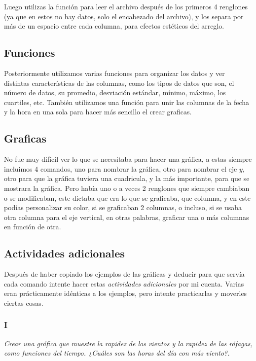 \documentclass{article}
\begin{document}
Luego utilizas la función para leer el archivo después de los primeros 4 renglones (ya que en estos no hay datos, solo el encabezado del archivo), y los separa por más de un espacio entre cada columna, para efectos estéticos del arreglo.

\subsection{Funciones}

Posteriormente utilizamos varias funciones para organizar los datos y ver distintas características de las columnas, como los tipos de datos que son, el número de datos, su promedio, desviación estándar, mínimo, máximo, los cuartiles, etc.
También utilizamos una función para unir las columnas de la fecha y la hora en una sola para hacer más sencillo el crear graficas.

\subsection{Graficas}

No fue muy difícil ver lo que se necesitaba para hacer una gráfica, a estas siempre incluimos 4 comandos, uno para nombrar la gráfica, otro para nombrar el eje $y$, otro para que la gráfica tuviera una cuadricula, y la más importante, para que se mostrara la gráfica. Pero había uno o a veces 2 renglones que siempre cambiaban o se modificaban, este dictaba que era lo que se graficaba, que columna, y en este podías personalizar su color, si se graficaban 2 columnas, o incluso, si se usaba otra columna para el eje vertical, en otras palabras, graficar una o más columnas en función de otra. 

\subsection{Actividades adicionales}

Después de haber copiado los ejemplos de las gráficas y deducir para que servía cada comando intente hacer estas \textit{actividades adicionales} por mi cuenta. Varias eran prácticamente idénticas a los ejemplos, pero intente practicarlas y moverles ciertas cosas.

\subsubsection{I}
\textit{Crear una gráfica que muestre la rapidez de los vientos y la rapidez de las ráfagas, como funciones del tiempo. ¿Cuáles son las horas del día con más viento?.}
\end{document}
